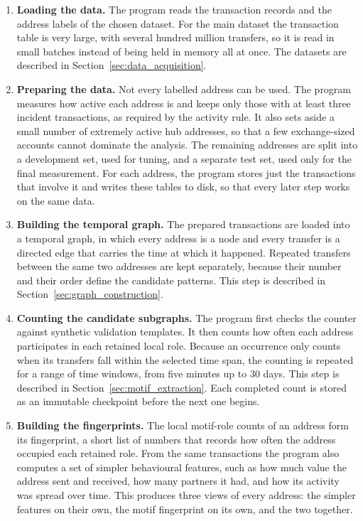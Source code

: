 \documentclass{thesisclass}
\begin{document}
\begin{enumerate}
  \item \textbf{Loading the data.} The program reads the transaction records and
        the address labels of the chosen dataset. For the main dataset the
        transaction table is very large, with several hundred million transfers,
        so it is read in small batches instead of being held in memory all at
        once. The datasets are described in Section~\ref{sec:data_acquisition}.

  \item \textbf{Preparing the data.} Not every labelled address can be used. The
        program measures how active each address is and keeps only those with
        at least three incident transactions, as required by the activity rule. It also sets aside a small
        number of extremely active hub addresses, so that a few exchange-sized
        accounts cannot dominate the analysis. The remaining addresses are split
        into a development set, used for tuning, and a separate test set, used
        only for the final measurement. For each address, the program stores just
        the transactions that involve it and writes these tables to
        disk, so that every later step works on the same data.

  \item \textbf{Building the temporal graph.} The prepared transactions are
        loaded into a temporal graph, in which every address is a node and every
        transfer is a directed edge that carries the time at which it happened.
        Repeated transfers between the same two addresses are kept separately,
        because their number and their order define the candidate patterns.
        This step is described in Section~\ref{sec:graph_construction}.

  \item \textbf{Counting the candidate subgraphs.} The program first checks the
        counter against synthetic validation templates. It then counts how
        often each address participates in each retained local role.
        Because an occurrence only counts when its transfers fall within the
        selected time span, the counting is repeated for a range of time windows,
        from five minutes up to 30 days. This step is described in
        Section~\ref{sec:motif_extraction}. Each completed count is stored as an
        immutable checkpoint before the next one begins.

  \item \textbf{Building the fingerprints.} The local motif-role counts of an address form
        its fingerprint, a short list of numbers that records how often the
        address occupied each retained role. From the same transactions the program
        also computes a set of simpler behavioural features, such as how much
        value the address sent and received, how many partners it had, and how
        its activity was spread over time. This produces three views of every
        address: the simpler features on their own, the motif fingerprint on its
        own, and the two together.


\end{enumerate}
\end{document}
